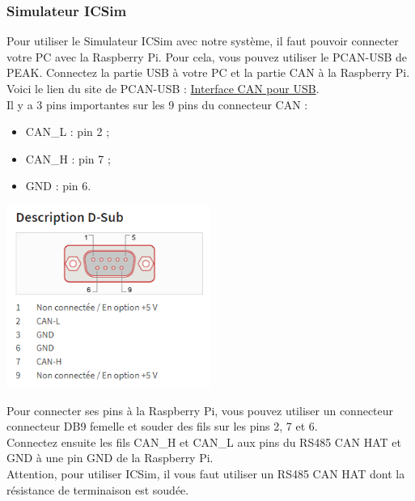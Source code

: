 \subsubsection{Simulateur ICSim}

Pour utiliser le Simulateur ICSim avec notre système, il faut pouvoir connecter votre PC avec la Raspberry Pi. Pour cela, vous pouvez utiliser le PCAN-USB de PEAK. Connectez la partie USB à votre PC et la partie CAN à la Raspberry Pi.\\

Voici le lien du site de PCAN-USB : \href{https://www.peak-system.com/PCAN-USB.199.0.html?&L=2}{Interface CAN pour USB}.\\

Il y a 3 pins importantes sur les 9 pins du connecteur CAN :
\begin{itemize}
    \item CAN\_L : pin 2 ;
    \item CAN\_H : pin 7 ;
    \item GND : pin 6.
\end{itemize}

\begin{minipage}
    \textwidth
    \centering
    \includegraphics[width=0.5\textwidth]{../figures/D-Sub_PEAK.png}
\end{minipage}

Pour connecter ses pins à la Raspberry Pi, vous pouvez utiliser un connecteur connecteur DB9 femelle et souder des fils sur les pins 2, 7 et 6.\\

Connectez ensuite les fils CAN\_H et CAN\_L aux pins du RS485 CAN HAT et GND à une pin GND de la Raspberry Pi.\\

Attention, pour utiliser ICSim, il vous faut utiliser un RS485 CAN HAT dont la résistance de terminaison est soudée.\\

